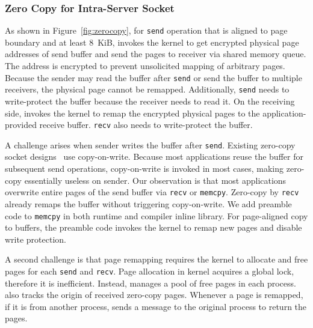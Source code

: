 \subsubsection{Zero Copy for Intra-Server Socket}
\label{subsec:zero-copy-intra}

As shown in Figure~\ref{fig:zerocopy}, for \texttt{send} operation that is aligned to page boundary and at least 8~KiB, \libipc{} invokes the kernel to get encrypted physical page addresses of send buffer and send the pages to receiver via shared memory queue.
The address is encrypted to prevent unsolicited mapping of arbitrary pages.
Because the sender may read the buffer after \texttt{send} or send the buffer to multiple receivers, the physical page cannot be remapped.
Additionally, \texttt{send} needs to write-protect the buffer because the receiver needs to read it.
On the receiving side, \libipc{} invokes the kernel to remap the encrypted physical pages to the application-provided receive buffer.
\texttt{recv} also needs to write-protect the buffer.

A challenge arises when sender writes the buffer after \texttt{send}.
Existing zero-copy socket designs~\cite{thadani1995efficient,chu1996zero} use copy-on-write. %
Because most applications reuse the buffer for subsequent send operations, copy-on-write is invoked in most cases, making zero-copy essentially useless on sender.
Our observation is that most applications overwrite entire pages of the send buffer via \texttt{recv} or \texttt{memcpy}. %
Zero-copy by \texttt{recv} already remaps the buffer without triggering copy-on-write.
We add preamble code to \texttt{memcpy} in both \libipc{} runtime and compiler inline library. 
For page-aligned copy to \libipc{} buffers, the preamble code invokes the kernel to remap new pages and disable write protection.

A second challenge is that page remapping requires the kernel to allocate and free pages for each \texttt{send} and \texttt{recv}. Page allocation in kernel acquires a global lock, therefore it is inefficient. Instead, \libipc{} manages a pool of free pages in each process.
\libipc{} also tracks the origin of received zero-copy pages.
Whenever a page is remapped, if it is from another process, \libipc{} sends a message to the original process to return the pages.

